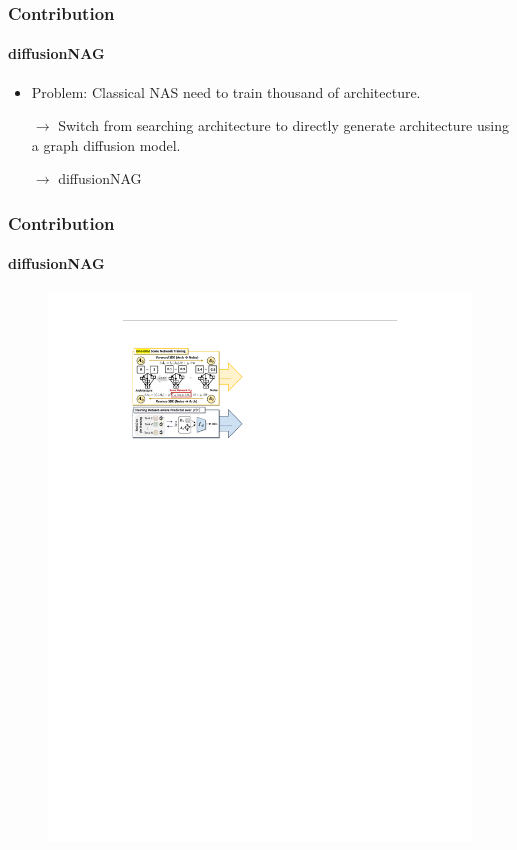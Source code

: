 \documentclass[aspectratio=169,xcolor=dvipsnames]{beamer}
\begin{document}
\begin{frame}
    \frametitle{Contribution}
    \framesubtitle{diffusionNAG}
    \begin{itemize}
        \item Problem: Classical NAS need to train thousand of architecture.
        \item [$\rightarrow$] Switch from searching architecture to directly generate architecture using a graph diffusion model.
        \item [$\rightarrow$] diffusionNAG
    \end{itemize}
\end{frame}

\begin{frame}
    \frametitle{Contribution}
    \framesubtitle{diffusionNAG}
    \begin{figure}[htbp]
        \centering
        \includegraphics[height=.80\textheight]{diffusionNAG_part1.pdf}
    \end{figure}
\end{frame}
\end{document}
